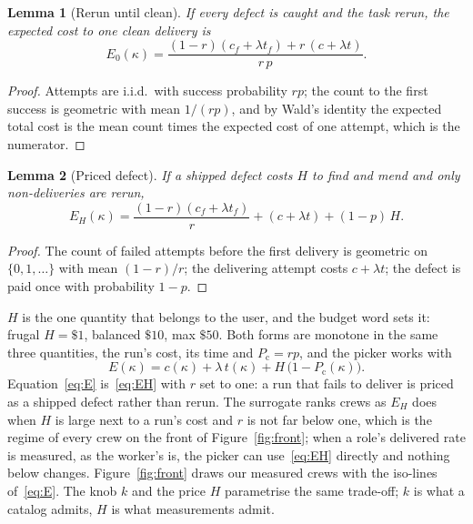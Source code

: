\documentclass[10pt,a4paper]{article}
\newcommand{\pclean}{P_{\mathrm{c}}}
\newtheorem{lemma}{Lemma}
\theoremstyle{definition}
\theoremstyle{remark}
\begin{document}
\begin{lemma}[Rerun until clean]
If every defect is caught and the task rerun, the expected cost to one clean delivery is
\begin{equation}
E_0(\kappa)=\frac{(1-r)(c_f+\lambda t_f)+r\,(c+\lambda t)}{r\,p}.
\label{eq:E0}
\end{equation}
\end{lemma}
\begin{proof}
Attempts are i.i.d.\ with success probability $rp$; the count to the first success is geometric with mean $1/(rp)$, and by Wald's identity the expected total cost is the mean count times the expected cost of one attempt, which is the numerator.
\end{proof}

\begin{lemma}[Priced defect]
If a shipped defect costs $H$ to find and mend and only non-deliveries are rerun,
\begin{equation}
E_H(\kappa)=\frac{(1-r)(c_f+\lambda t_f)}{r} + (c+\lambda t) + (1-p)\,H .
\label{eq:EH}
\end{equation}
\end{lemma}
\begin{proof}
The count of failed attempts before the first delivery is geometric on $\{0,1,\dots\}$ with mean $(1-r)/r$; the delivering attempt costs $c+\lambda t$; the defect is paid once with probability $1-p$.
\end{proof}

$H$ is the one quantity that belongs to the user, and the budget word sets it: frugal $H=\$1$, balanced $\$10$, max $\$50$. Both forms are monotone in the same three quantities, the run's cost, its time and $\pclean=rp$, and the picker works with
\begin{equation}
E(\kappa)=c(\kappa)+\lambda\,t(\kappa)+H\,\big(1-\pclean(\kappa)\big).
\label{eq:E}
\end{equation}
Equation~\eqref{eq:E} is~\eqref{eq:EH} with $r$ set to one: a run that fails to deliver is priced as a shipped defect rather than rerun. The surrogate ranks crews as $E_H$ does when $H$ is large next to a run's cost and $r$ is not far below one, which is the regime of every crew on the front of Figure~\ref{fig:front}; when a role's delivered rate is measured, as the worker's is, the picker can use~\eqref{eq:EH} directly and nothing below changes. Figure~\ref{fig:front} draws our measured crews with the iso-lines of~\eqref{eq:E}. The knob $k$ and the price $H$ parametrise the same trade-off; $k$ is what a catalog admits, $H$ is what measurements admit.
\end{document}
